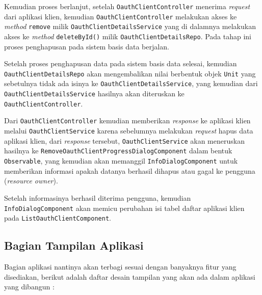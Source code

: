 \documentclass[pdftex,12pt, oneside]{article}
\begin{document}
\begin{itemize}
	Kemudian proses berlanjut, setelah \texttt{OauthClientController} menerima \textit{request} dari aplikasi klien, kemudian \texttt{OauthClientController} melakukan akses ke \textit{method} \texttt{remove} milik \texttt{OauthClientDetailsService} yang di dalamnya melakukan akses ke \textit{method} \texttt{deleteById()} milik \texttt{OauthClientDetailsRepo}. Pada tahap ini proses penghapusan pada sistem basis data berjalan.
	
	Setelah proses penghapusan data pada sistem basis data selesai, kemudian \texttt{OauthClientDetailsRepo} akan mengembalikan nilai berbentuk objek \texttt{Unit} yang sebetulnya tidak ada isinya ke \texttt{OauthClientDetailsService}, yang kemudian dari \texttt{OauthClientDetailsService} hasilnya akan diteruskan ke \texttt{OauthClientController}.
	
	Dari \texttt{OauthClientController} kemudian memberikan \textit{response} ke aplikasi klien melalui \texttt{OauthClientService} karena sebelumnya melakukan \textit{request} hapus data aplikasi klien, dari \textit{response} tersebut, \texttt{OauthClientService} akan meneruskan hasilnya ke \texttt{RemoveOauthClientProgressDialogComponent} dalam bentuk \texttt{Observable}, yang kemudian akan memanggil \texttt{InfoDialogComponent} untuk memberikan informasi apakah datanya berhasil dihapus atau gagal ke pengguna (\textit{resource owner}).	
	
	Setelah informasinya berhasil diterima pengguna, kemudian \texttt{InfoDialogComponent} akan memicu perubahan isi tabel daftar aplikasi klien pada \texttt{ListOauthClientComponent}.
	
\end{itemize}

\subsection{Bagian Tampilan Aplikasi}

Bagian aplikasi nantinya akan terbagi sesuai dengan banyaknya fitur yang disediakan, berikut adalah daftar desain tampilan yang akan ada dalam aplikasi yang dibangun :
\end{document}
